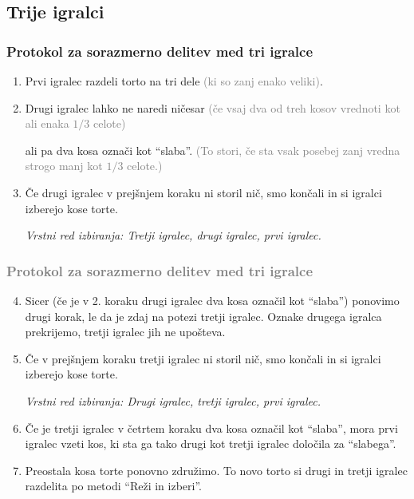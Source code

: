 \documentclass{beamer}
\begin{document}
\subsection{Trije igralci}
\begin{frame}


\frametitle{Protokol za sorazmerno delitev med tri igralce}
\begin{enumerate}

\item Prvi igralec razdeli torto na tri dele \textcolor{gray}{(ki so zanj enako veliki)}.

\item Drugi igralec lahko ne naredi ničesar \textcolor{gray}{(če vsaj dva od treh kosov vrednoti kot ali enaka $1/3$ celote)}

ali pa dva kosa označi kot ``slaba''. \textcolor{gray}{(To stori, če sta vsak posebej zanj vredna strogo manj kot $1/3$ celote.)}

\item Če drugi igralec v prejšnjem koraku ni storil nič, smo končali in si igralci izberejo kose torte.

\textsl{Vrstni red izbiranja: Tretji igralec, drugi igralec, prvi igralec.}

\end{enumerate}
\end{frame}
\begin{frame}
\frametitle{\textcolor{gray}{Protokol za sorazmerno delitev med tri igralce}}
\begin{enumerate}
\setcounter{enumi}{3}

\item Sicer (če je v 2. koraku drugi igralec dva kosa označil kot ``slaba'') ponovimo drugi korak, le da je zdaj na potezi tretji igralec. Oznake drugega igralca prekrijemo, tretji igralec jih ne upošteva.

\item Če v prejšnjem koraku tretji igralec ni storil nič, smo končali in si igralci izberejo kose torte.

\textsl{Vrstni red izbiranja: Drugi igralec, tretji igralec, prvi igralec.}


\item Če je tretji igralec v četrtem koraku dva kosa označil kot ``slaba'', mora prvi igralec vzeti kos, ki sta ga tako drugi kot tretji igralec določila za ``slabega''.

\item Preostala kosa torte ponovno združimo. To novo torto si drugi in tretji igralec razdelita po metodi ``Reži in izberi''.

\end{enumerate}

\end{frame}
\end{document}
